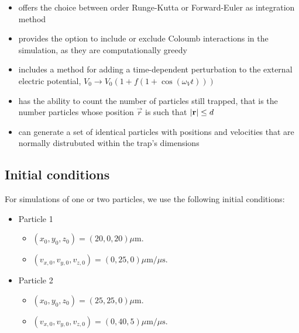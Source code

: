 \begin{itemize}
    \item offers the choice between  order Runge-Kutta or Forward-Euler as integration method %
    \item provides the option to include or exclude Coloumb interactions in the simulation, as they are computationally greedy
    \item includes a method for adding a time-dependent perturbation to the external electric potential, $V_0\rightarrow V_0 (1+ f(1+\cos{(\omega_V t)}))$
    \item has the ability to count the number of particles still trapped, that is the number particles whose position $\vec{r}$ is such that $\abs{\mathbf{r}} \leq d$
    \item can generate a set of identical particles with positions and velocities that are normally distrubuted within the trap's dimensions
\end{itemize}


\subsection{Initial conditions}\label{sec:initial_conditions}
For simulations of one or two particles, we use the following initial conditions:
\begin{itemize}
    \item Particle 1\label{item:initial_conditions_p1}
    \begin{itemize}
        \item[] $(x_0, y_0, z_0) = (20,0,20) \mu\mathrm{m}$.
        \item[] $(v_{x,0}, v_{y,0}, v_{z,0}) = (0,25,0) \mu\mathrm{m}/\mu\mathrm{s}$.
    \end{itemize}
    \item Particle 2\label{item:initial_conditions_p2}
    \begin{itemize}
        \item[] $(x_0, y_0, z_0) = (25,25,0) \mu\mathrm{m}$.
        \item[] $(v_{x,0}, v_{y,0}, v_{z,0}) = (0,40,5) \mu\mathrm{m}/\mu\mathrm{s}$.
    \end{itemize}
\end{itemize}





